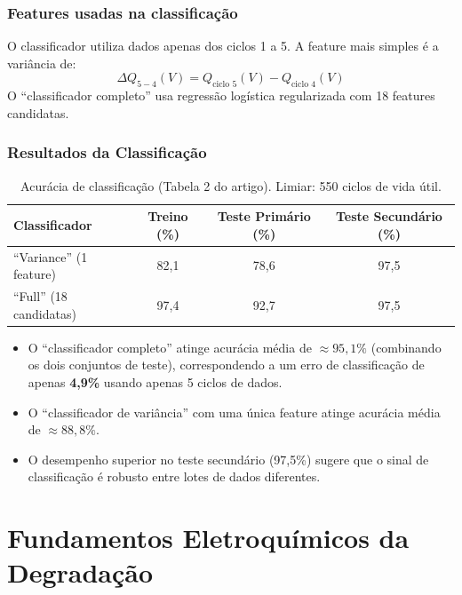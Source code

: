 \documentclass[12pt,a4paper]{article}
\begin{document}
\subsubsection{Features usadas na classifica\c{c}\~ao}

O classificador utiliza dados apenas dos ciclos 1 a 5. A feature mais simples
\'{e} a vari\^{a}ncia de:
\[\Delta Q_{5-4}(V) = Q_{\text{ciclo 5}}(V) - Q_{\text{ciclo 4}}(V)\]
O ``classificador completo'' usa regress\~ao log\'{i}stica regularizada com
18 features candidatas.

\subsubsection{Resultados da Classifica\c{c}\~ao}

\begin{table}[H]
\centering
\caption{Acur\'{a}cia de classifica\c{c}\~ao (Tabela 2 do artigo).
  Limiar: 550 ciclos de vida \'{u}til.}
\begin{tabular}{@{}lccc@{}}
\toprule
\textbf{Classificador} & \textbf{Treino (\%)} &
\textbf{Teste Prim\'{a}rio (\%)} & \textbf{Teste Secund\'{a}rio (\%)} \\
\midrule
``Variance'' (1 feature) & 82,1 & 78,6 & 97,5 \\
``Full'' (18 candidatas) & 97,4 & 92,7 & 97,5 \\
\bottomrule
\end{tabular}
\end{table}

\begin{destaque}[Interpreta\c{c}\~ao]
\begin{itemize}
  \item O ``classificador completo'' atinge acur\'{a}cia m\'{e}dia de $\approx 95{,}1\%$
    (combinando os dois conjuntos de teste), correspondendo a um erro de
    classifica\c{c}\~ao de apenas \textbf{4,9\%} usando apenas 5 ciclos de dados.
  \item O ``classificador de vari\^{a}ncia'' com uma \'{u}nica feature atinge
    acur\'{a}cia m\'{e}dia de $\approx 88{,}8\%$.
  \item O desempenho superior no teste secund\'{a}rio (97,5\%) sugere que o
    sinal de classifica\c{c}\~ao \'{e} robusto entre lotes de dados diferentes.
\end{itemize}
\end{destaque}

\section{Fundamentos Eletroqu\'{i}micos da Degrada\c{c}\~ao}
\end{document}
